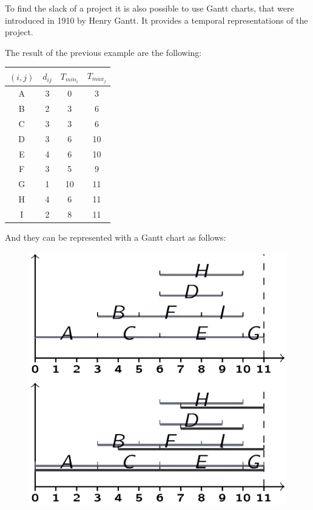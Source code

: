 \documentclass[12pt, a4paper]{report}
\begin{document}
    To find the slack of a project it is also possible to use Gantt charts, that were introduced in 1910 by Henry Gantt. It provides a temporal representations of the project. 
    \begin{example}
        The result of the previous example are the following: 
        \begin{table}[H]
            \centering
            \begin{tabular}{cccc}
            \hline
            $(i,j)$ & $d_{ij}$ & $T_{min_i}$ & $T_{max_j}$ \\ \hline
            A       & 3        & 0           & 3           \\
            B       & 2        & 3           & 6           \\
            C       & 3        & 3           & 6           \\
            D       & 3        & 6           & 10          \\
            E       & 4        & 6           & 10          \\
            F       & 3        & 5           & 9           \\
            G       & 1        & 10          & 11          \\
            H       & 4        & 6           & 11          \\
            I       & 2        & 8           & 11          \\ \hline
            \end{tabular}
        \end{table}
        And they can be represented with a Gantt chart as follows: 
        \begin{figure}[H]
            \centering
            \includegraphics[width=0.3\linewidth]{images/Gantt.png}
        \end{figure}
    \end{example}
\end{document}
